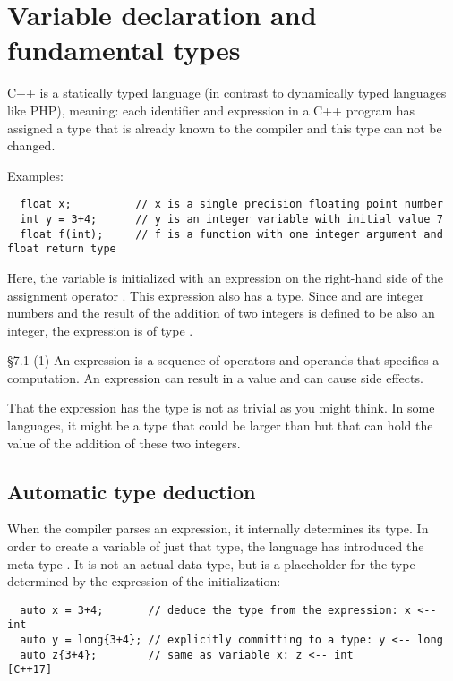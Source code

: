 \section{Variable declaration and fundamental types\label{sec:data-type}}
C++ is a statically typed language (in contrast to dynamically typed languages like \eg PHP), meaning: each identifier and expression in a
C++ program has assigned a type that is already known to the compiler and this type can not be changed.

Examples:
\begin{verbatim}
  float x;          // x is a single precision floating point number
  int y = 3+4;      // y is an integer variable with initial value 7
  float f(int);     // f is a function with one integer argument and float return type
\end{verbatim}

Here, the variable  is initialized with an expression on the right-hand side of the assignment operator \cpp{=}. This
expression  also has a type. Since  and  are integer numbers and the result of the addition of two integers is
defined to be also an integer, the expression is of type .

\begin{standard}{\S 7.1 (1)}
  An expression is a sequence of operators and operands that specifies a computation. An expression can result in a value and can cause side effects.
\end{standard}

\begin{rem}
  That the expression  has the type  is not as trivial as you might think. In some languages, it might be a type that could be
  larger than  but that can hold the value of the addition of these two integers.
\end{rem}


\subsection{Automatic type deduction}
When the compiler parses an expression, it internally determines its type. In order to create a variable of just that type, the language has
introduced the meta-type . It is not an actual data-type, but is a placeholder for the type determined by the expression of the
initialization:
\begin{verbatim}
  auto x = 3+4;       // deduce the type from the expression: x <-- int
  auto y = long{3+4}; // explicitly committing to a type: y <-- long
  auto z{3+4};        // same as variable x: z <-- int                  [C++17]
\end{verbatim}

